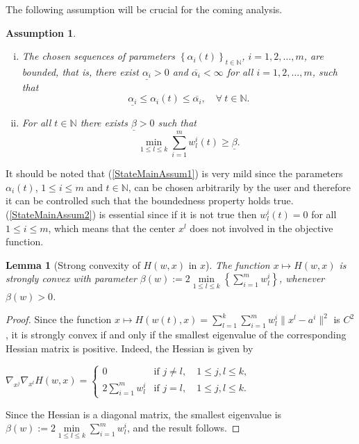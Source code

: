 \documentclass[11pt]{article}
\numberwithin{equation}{section}
\newtheorem{lemma}{Lemma}[proposition]
\newtheorem{assumption}{Assumption}
\begin{document}
The following assumption will be crucial for the coming analysis.
\begin{assumption} \label{StateMainAssum}
\begin{enumerate}[(i)] 
	\item The chosen sequences of parameters $\left\lbrace \alpha_i(t) \right\rbrace_{t \in \mathbb{N}}$, $i=1,2, \ldots, m$, are bounded, that is, there exist $\underline{\alpha_i} > 0$ and $\overline{\alpha_i} < \infty$ for all $i=1,2, \ldots, m$, such that
		\begin{equation}
			\underline{\alpha_i} \leq \alpha_i(t) \leq \overline{\alpha_i}, \quad \forall \: t \in \mathbb{N}.
		\end{equation}		 \label{StateMainAssum1}
	\item For all $t \in \mathbb{N}$ there exists $\underline{\beta} > 0$ such that
		\begin{equation}
			\min\limits_{1 \leq l \leq k} \sum\limits_{i=1}^{m} w^i_l(t) \geq \underline{\beta}. \label{State_beta}
		\end{equation}		 \label{StateMainAssum2}
\end{enumerate}
\end{assumption}
It should be noted that (\ref{StateMainAssum1}) is very mild since the parameters $\alpha_i(t)$, $1 \leq i \leq m$ and $t \in \mathbb{N}$, can be chosen arbitrarily by the user and therefore it can be controlled such that the boundedness property holds true. (\ref{StateMainAssum2}) is essential since if it is not true then $w^i_l(t)=0$ for all $1 \leq i \leq m$, which means that the center $x^l$ does not involved in the objective function.

\begin{lemma}[Strong convexity of $H(w,x)$ in $x$] \label{StateEq14}
The function $x \mapsto H(w,x)$ is strongly convex with parameter $\beta(w) := 2 \min\limits_{1 \leq l \leq k} \left\lbrace \sum\limits_{i=1}^{m} w^i_l\right \rbrace$, whenever $\beta(w) > 0$.
\end{lemma}

\begin{proof}
Since the function $x \mapsto H(w(t),x) = 
\sum\limits_{l=1}^{k} \sum\limits_{i=1}^{m} w^i_l \|x^l - a^i\|^2$ is $C^2$, it is strongly convex if and only if the smallest eigenvalue of the corresponding Hessian matrix is positive. Indeed, the Hessian is given by

\begin{center}
$\nabla_{x^j} \nabla_{x^l} H(w,x) = 
\begin{cases} 0 &\mbox{if } j \neq l, \quad 1 \leq j,l \leq k ,
\\ 2\sum\limits_{i=1}^{m} w^i_l &\mbox{if } j = l, \quad 1 \leq j,l \leq k. \end{cases} $
\end{center}

Since the Hessian is a diagonal matrix, the smallest eigenvalue is $\beta(w) := 2\min\limits_{1 \leq l \leq k} \sum\limits_{i=1}^{m} w^i_l$, and the result follows.
\end{proof}
\end{document}

